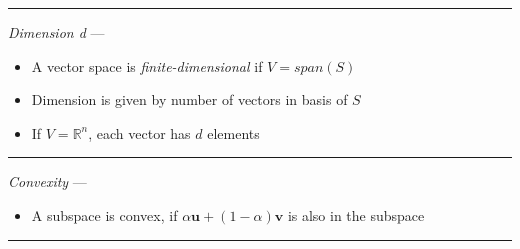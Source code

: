 {\color{lightgray}\hrule height 0.001mm}

\emph{Dimension d} --- 
\begin{itemize}
    \item A vector space is \emph{finite-dimensional} if $V = span(S)$
    \item Dimension is given by number of vectors in basis of $S$
    \item If $V = \mathbb{R}^n$, each vector has $d$ elements
\end{itemize}

{\color{lightgray}\hrule height 0.001mm}

\emph{Convexity} --- 
\begin{itemize}
    \item A subspace is convex, if $\alpha \boldsymbol{u} + (1-\alpha) \boldsymbol{v}$ is also in the subspace
\end{itemize}

{\color{lightgray}\hrule height 0.001mm}

